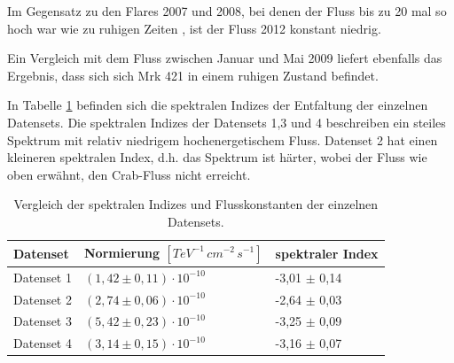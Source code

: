 Im Gegensatz zu den Flares 2007 und 2008, bei denen der Fluss bis zu 20 mal so hoch war wie zu ruhigen Zeiten \cite{DissBackes}, ist der Fluss 2012 konstant niedrig.

Ein Vergleich mit dem Fluss zwischen Januar und Mai 2009 \cite{DissDiego} liefert ebenfalls das Ergebnis, dass sich sich Mrk 421 in einem ruhigen Zustand befindet.

In Tabelle \ref{tab:SpektraleIndizes} befinden sich die spektralen Indizes der Entfaltung der einzelnen Datensets.
Die spektralen Indizes der Datensets 1,3 und 4 beschreiben ein steiles Spektrum mit relativ niedrigem hochenergetischem Fluss.
Datenset 2 hat einen kleineren spektralen Index, d.h. das Spektrum ist härter, wobei der Fluss wie oben erwähnt, den Crab-Fluss nicht erreicht.


\begin{table}[!h]
\centering
\caption{Vergleich der spektralen Indizes und Flusskonstanten der einzelnen Datensets.}
\label{tab:SpektraleIndizes}
\begin{tabular}{lll}
  \toprule
  Datenset & Normierung $\left[\si{TeV^{-1}\,cm^{-2}\,s^{-1}}\right]$ & spektraler Index\\
  \midrule
  \midrule
Datenset 1 & $(1,42\pm 0,11)\cdot 10^{-10}$ & -3,01 $\pm$ 0,14 \\
Datenset 2 & $(2,74\pm 0,06)\cdot 10^{-10}$ & -2,64 $\pm$ 0,03 \\
Datenset 3 & $(5,42\pm 0,23)\cdot 10^{-10}$ & -3,25 $\pm$ 0,09 \\
Datenset 4 & $(3,14\pm 0,15)\cdot 10^{-10}$ & -3,16 $\pm$ 0,07 \\
  \bottomrule
\end{tabular}
\end{table}


